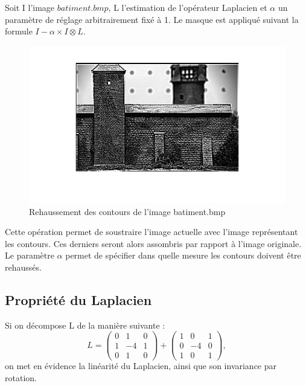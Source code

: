 \documentclass[11pt]{article}
\begin{document}
		Soit I l'image $batiment.bmp$, L l'estimation de l'opérateur Laplacien et $\alpha$ un paramètre de réglage arbitrairement fixé à 1. 
		Le masque est appliqué suivant la formule $I - \alpha \times I \otimes L$.

		\begin{figure}[h]
			\centering
			\includegraphics[scale=1]{img/rehaussement_contours.png}
			\caption{Rehaussement des contours de l'image batiment.bmp}
			\label{img1}
		\end{figure}
		
		Cette opération permet de soustraire l'image actuelle avec l'image représentant les contours. Ces derniers seront alors assombris par rapport à l'image originale. Le paramètre $\alpha$ permet de spécifier dans quelle mesure les contours doivent être rehaussés.
		

	\subsection{Propriété du Laplacien}
	
		Si on décompose L de la manière suivante :
		\[ L = \left( \begin{array}{ccc}
0 & 1 & 0 \\
1 & -4 & 1 \\
0 & 1 & 0
\end{array} 
\right)
+ \left( \begin{array}{ccc}
1 & 0 & 1 \\
0 & -4 & 0 \\
1 & 0 & 1
\end{array} 
\right),
\]
		on met en évidence la linéarité du Laplacien, ainsi que son invariance par rotation.
\end{document}

